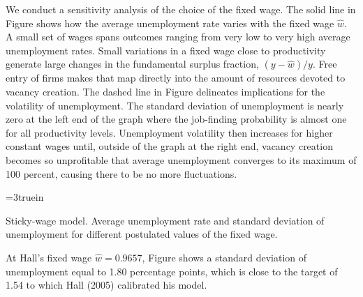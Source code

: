 We conduct a sensitivity analysis of the choice of the fixed wage.
The solid line in Figure  shows how
the average unemployment rate varies with the fixed wage $\hat w$.
A small set  of wages spans outcomes ranging from
 very low to  very high average unemployment rates.
Small variations in a fixed wage close to
productivity generate large changes in the fundamental surplus
fraction, $(y-\hat w)/y$.  Free entry of firms makes that map
directly into the amount of resources devoted to vacancy creation.
The dashed line in Figure 
delineates  implications
for the volatility of unemployment. The standard deviation of
unemployment is nearly zero at the left end of the graph where the
job-finding probability is almost one for all productivity levels.
Unemployment volatility then increases for higher constant wages
until, outside of the graph at the right end, vacancy creation
becomes so unprofitable that average unemployment converges to its
maximum of 100 percent, causing there to be no more fluctuations.



\centerline{\epsfxsize=3truein}
\caption{Sticky-wage model. Average unemployment rate and standard
deviation of unemployment for
different postulated values of the fixed wage.}
\endfigure


At Hall's fixed wage $\hat w = 0.9657$, Figure 
shows a standard deviation of unemployment equal to
1.80 percentage points, which is close to the target of 1.54 to which
Hall (2005) calibrated his model.


